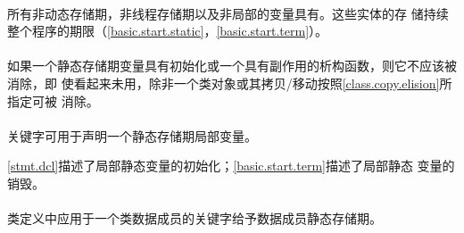 \paragraph{} %
所有非动态存储期，非线程存储期以及非局部的变量具有。这些实体的存
储持续整个程序的期限（\ref{basic.start.static}，\ref{basic.start.term}）。

\paragraph{} %
如果一个静态存储期变量具有初始化或一个具有副作用的析构函数，则它不应该被消除，即
使看起来未用，除非一个类对象或其拷贝/移动按照\ref{class.copy.elision}所指定可被
消除。

\paragraph{} %
关键字可用于声明一个静态存储期局部变量。

\begin{note}
  \ref{stmt.dcl}描述了局部静态变量的初始化；\ref{basic.start.term}描述了局部静态
  变量的销毁。
\end{note}

\paragraph{} %
类定义中应用于一个类数据成员的关键字给予数据成员静态存储期。
